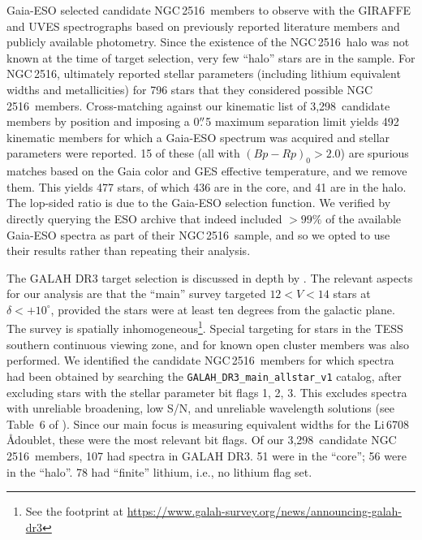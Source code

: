\documentclass[12pt,twocolumn,tighten]{aastex63}
\newcommand{\cn}{NGC\,2516} %
\newcommand{\nkinematic}{3{,}298\ } %
\begin{document}
Gaia-ESO selected candidate \cn\ members to observe with the GIRAFFE
and UVES spectrographs based on previously reported literature members
and publicly available photometry.  Since the existence of the \cn\
halo was not known at the time of target selection, very few ``halo''
stars are in the sample.  For \cn, \citet{randich_gaiaeso_2018}
ultimately reported stellar parameters (including lithium equivalent
widths and metallicities) for 796 stars that they considered possible
\cn\ members.  Cross-matching against our kinematic list of
\nkinematic candidate members by position and imposing a 0$\mbox{$.\!\!^{\prime\prime}$}$5
maximum separation limit yields 492 kinematic members for which a
Gaia-ESO spectrum was acquired and stellar parameters were reported.
15 of these (all with $(Bp-Rp)_0 > 2.0$) are spurious matches based on
the Gaia color and GES effective temperature, and we remove them.
This yields 477 stars, of which 436 are in the core, and 41 are in the
halo.  The lop-sided ratio is due to the Gaia-ESO selection function.
We verified by directly querying the ESO archive that
\citet{randich_gaiaeso_2018} indeed included $>99\%$ of the available
Gaia-ESO spectra as part of their \cn\ sample, and so we opted to use
their results rather than repeating their analysis.

The GALAH DR3 target selection is discussed in depth by
\citet{buder_galah_2020}.  The relevant aspects for our analysis are
that the ``main'' survey targeted $12<V<14$ stars at
$\delta<+10^\circ$, provided the stars were at least ten degrees from
the galactic plane.  The survey is spatially
inhomogeneous\footnote{See the footprint at
\url{https://www.galah-survey.org/news/announcing-galah-dr3}}. Special
targeting for stars in the TESS southern continuous viewing zone, and
for known open cluster members was also performed.  We identified the
candidate \cn\ members for which spectra had been obtained by
searching the \texttt{GALAH\_DR3\_main\_allstar\_v1} catalog, after
excluding stars with the stellar parameter bit flags 1, 2, 3.  This
excludes spectra with unreliable broadening, low S/N, and unreliable
wavelength solutions (see Table~6 of \citealt{buder_galah_2020}).
Since our main focus is measuring equivalent widths for the
Li\,6708\,\AA doublet, these were the most relevant bit flags.  Of our
\nkinematic candidate \cn\ members, 107 had spectra in GALAH DR3.  51
were in the ``core''; 56 were in the ``halo''.  78 had ``finite''
lithium, i.e., no lithium flag set.
\end{document}
